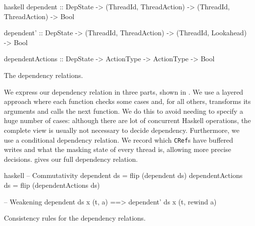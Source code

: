 \begin{listing}
\centering
\begin{cminted}{haskell}
dependent
  :: DepState
  -> (ThreadId, ThreadAction) -> (ThreadId, ThreadAction) -> Bool

dependent'
  :: DepState
  -> (ThreadId, ThreadAction) -> (ThreadId, Lookahead)    -> Bool

dependentActions
  :: DepState
  -> ActionType -> ActionType                             -> Bool
\end{cminted}
\caption{The \dejafu{} dependency relations.}\label{lst:deprel-simp}
\end{listing}

We express our dependency relation in three parts, shown in
.  We use a layered approach where each function
checks some cases and, for all others, transforms its arguments and
calls the next function.  We do this to avoid needing to specify a
huge number of cases: although there are lot of concurrent Haskell
operations, the complete view is usually not necessary to decide
dependency.  Furthermore, we use a conditional dependency
relation\cite{godefroid1993}.  We record which \verb|CRef|s have
buffered writes and what the masking state of every thread is,
allowing more precise decisions.   gives our full
dependency relation.

\begin{listing}
\centering
\begin{cminted}{haskell}
-- Commutativity
dependent        ds = flip (dependent        ds)
dependentActions ds = flip (dependentActions ds)

-- Weakening
dependent ds x (t, a) ==> dependent' ds x (t, rewind a)
\end{cminted}
\caption{Consistency rules for the dependency relations.}\label{lst:deprel-consistency}
\end{listing}

